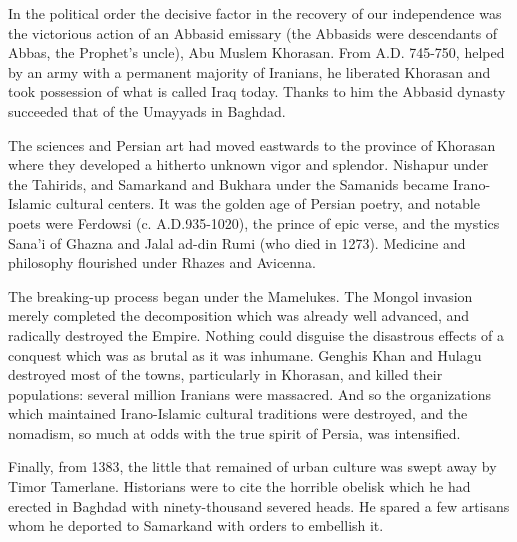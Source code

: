 In the political order the decisive factor in the recovery of our independence was the victorious action of an Abbasid emissary (the Abbasids were descendants of Abbas, the Prophet's uncle), Abu Muslem Khorasan. From A.D. 745-750, helped by an army with a permanent majority of Iranians, he liberated Khorasan and took possession of what is called Iraq today. Thanks to him the Abbasid dynasty succeeded that of the Umayyads in Baghdad. 

The sciences and Persian art had moved eastwards to the province of Khorasan where they developed a hitherto unknown vigor and splendor. Nishapur under the Tahirids, and Samarkand and Bukhara under the Samanids became Irano-Islamic cultural centers. It was the golden age of Persian poetry, and notable poets were Ferdowsi (c. A.D.935-1020), the prince of epic verse, and the mystics Sana'i of Ghazna and Jalal ad-din Rumi (who died in 1273). Medicine and philosophy flourished under Rhazes and Avicenna. 

The breaking-up process began under the Mamelukes. The Mongol invasion merely completed the decomposition which was already well advanced, and radically destroyed the Empire. Nothing could disguise the disastrous effects of a conquest which was as brutal as it was inhumane. Genghis Khan and Hulagu destroyed most of the towns, particularly in Khorasan, and killed their populations: several million Iranians were massacred. And so the organizations which maintained Irano-Islamic cultural traditions were destroyed, and the nomadism, so much at odds with the true spirit of Persia, was intensified. 

Finally, from 1383, the little that remained of urban culture was swept away by Timor Tamerlane. Historians were to cite the horrible obelisk which he had erected in Baghdad with ninety-thousand severed heads. He spared a few artisans whom he deported to Samarkand with orders to embellish it. 